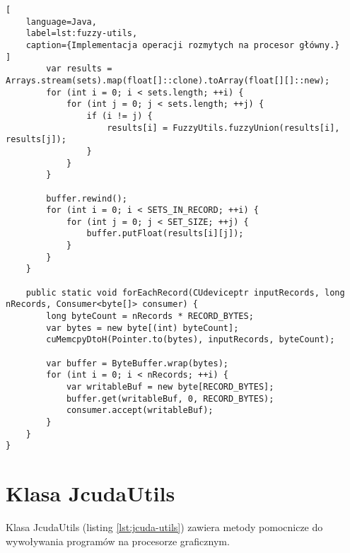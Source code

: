 \begin{lstlisting}[
    language=Java,
    label=lst:fuzzy-utils,
    caption={Implementacja operacji rozmytych na procesor główny.}
]
        var results = Arrays.stream(sets).map(float[]::clone).toArray(float[][]::new);
        for (int i = 0; i < sets.length; ++i) {
            for (int j = 0; j < sets.length; ++j) {
                if (i != j) {
                    results[i] = FuzzyUtils.fuzzyUnion(results[i], results[j]);
                }
            }
        }

        buffer.rewind();
        for (int i = 0; i < SETS_IN_RECORD; ++i) {
            for (int j = 0; j < SET_SIZE; ++j) {
                buffer.putFloat(results[i][j]);
            }
        }
    }

    public static void forEachRecord(CUdeviceptr inputRecords, long nRecords, Consumer<byte[]> consumer) {
        long byteCount = nRecords * RECORD_BYTES;
        var bytes = new byte[(int) byteCount];
        cuMemcpyDtoH(Pointer.to(bytes), inputRecords, byteCount);

        var buffer = ByteBuffer.wrap(bytes);
        for (int i = 0; i < nRecords; ++i) {
            var writableBuf = new byte[RECORD_BYTES];
            buffer.get(writableBuf, 0, RECORD_BYTES);
            consumer.accept(writableBuf);
        }
    }
}
\end{lstlisting}
\newpage

\section*{Klasa JcudaUtils}

Klasa JcudaUtils (listing \ref{lst:jcuda-utils}) zawiera metody pomocnicze do wywoływania programów na procesorze graficznym.

